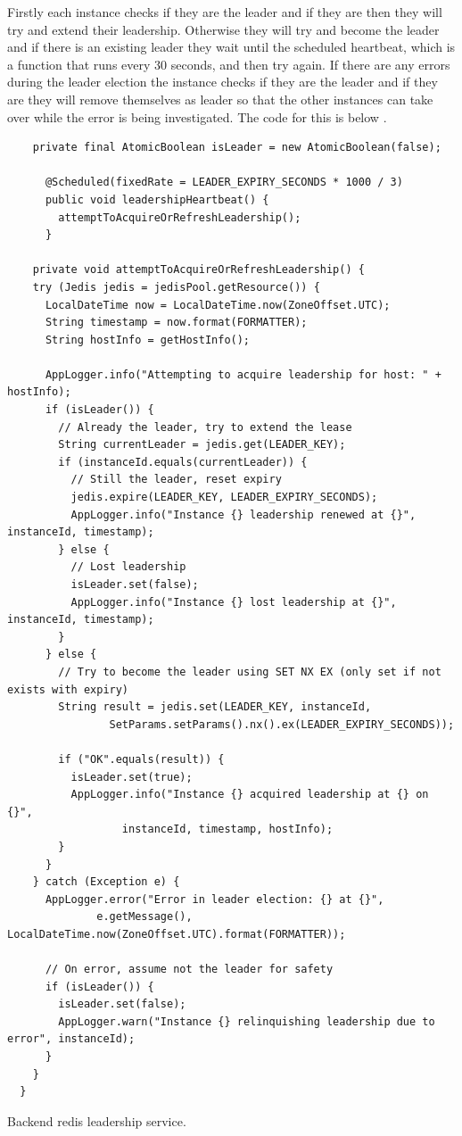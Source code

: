 \documentclass[]{project_report}
\begin{document}
Firstly each instance checks if they are the leader and if they are then they will try and extend their leadership. Otherwise they will try and become the leader and if there is an existing leader they wait until the scheduled heartbeat, which is a function that runs every 30 seconds, and then try again. If there are any errors during the leader election the instance checks if they are the leader and if they are they will remove themselves as leader so that the other instances can take over while the error is being investigated. The code for this is below \label{code:leadership service}.

\begin{codeblock}[H]
    \begin{verbatim}
    private final AtomicBoolean isLeader = new AtomicBoolean(false);

      @Scheduled(fixedRate = LEADER_EXPIRY_SECONDS * 1000 / 3)
      public void leadershipHeartbeat() {
        attemptToAcquireOrRefreshLeadership();
      }
  
    private void attemptToAcquireOrRefreshLeadership() {
    try (Jedis jedis = jedisPool.getResource()) {
      LocalDateTime now = LocalDateTime.now(ZoneOffset.UTC);
      String timestamp = now.format(FORMATTER);
      String hostInfo = getHostInfo();

      AppLogger.info("Attempting to acquire leadership for host: " + hostInfo);
      if (isLeader()) {
        // Already the leader, try to extend the lease
        String currentLeader = jedis.get(LEADER_KEY);
        if (instanceId.equals(currentLeader)) {
          // Still the leader, reset expiry
          jedis.expire(LEADER_KEY, LEADER_EXPIRY_SECONDS);
          AppLogger.info("Instance {} leadership renewed at {}", instanceId, timestamp);
        } else {
          // Lost leadership
          isLeader.set(false);
          AppLogger.info("Instance {} lost leadership at {}", instanceId, timestamp);
        }
      } else {
        // Try to become the leader using SET NX EX (only set if not exists with expiry)
        String result = jedis.set(LEADER_KEY, instanceId,
                SetParams.setParams().nx().ex(LEADER_EXPIRY_SECONDS));

        if ("OK".equals(result)) {
          isLeader.set(true);
          AppLogger.info("Instance {} acquired leadership at {} on {}",
                  instanceId, timestamp, hostInfo);
        }
      }
    } catch (Exception e) {
      AppLogger.error("Error in leader election: {} at {}",
              e.getMessage(), LocalDateTime.now(ZoneOffset.UTC).format(FORMATTER));

      // On error, assume not the leader for safety
      if (isLeader()) {
        isLeader.set(false);
        AppLogger.warn("Instance {} relinquishing leadership due to error", instanceId);
      }
    }
  }
\end{verbatim}
\caption{Backend redis leadership service.}
\label{code:leadership service}
\end{codeblock}
\end{document}
